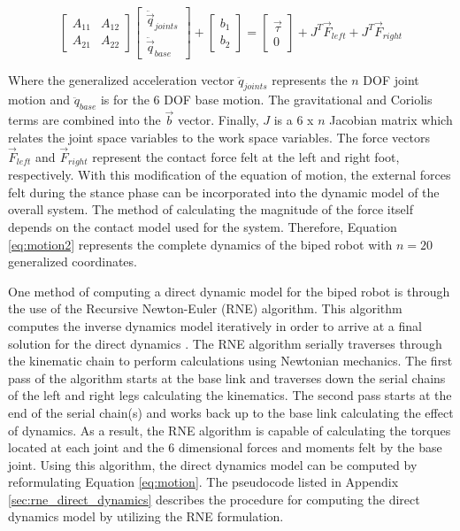 \begin{equation}
	\label{eq:motion2}
	\begin{bmatrix} A_{11} & A_{12} \\ A_{21} & A_{22} \end{bmatrix} 
	\begin{bmatrix} \ddot{\vec{q}}_{joints} \\ \ddot{\vec{q}}_{base} \end{bmatrix} + 
	\begin{bmatrix} b_{1} \\ b_{2} \end{bmatrix} = 
	\begin{bmatrix} \vec{\tau} \\ 0 \end{bmatrix} + 
    J^{T}\vec{F}_{left} + J^{T}\vec{F}_{right}
\end{equation}

Where the generalized acceleration vector $\ddot{q}_{joints}$ represents the $n$ DOF joint motion and $\ddot{q}_{base}$ is for the 6 DOF base motion. The gravitational and Coriolis terms are combined into the $\vec{b}$ vector. Finally, $J$ is a 6 x $n$ Jacobian matrix which relates the joint space variables to the work space variables. The force vectors $\vec{F}_{left}$ and $\vec{F}_{right}$ represent the contact force felt at the left and right foot, respectively. With this modification of the equation of motion, the external forces felt during the stance phase can be incorporated into the dynamic model of the overall system. The method of calculating the magnitude of the force itself depends on the contact model used for the system. Therefore, Equation \ref{eq:motion2} represents the complete dynamics of the biped robot with $n = 20$ generalized coordinates.

One method of computing a direct dynamic model for the biped robot is through the use of the Recursive Newton-Euler (RNE) algorithm. This algorithm computes the inverse dynamics model iteratively in order to arrive at a final solution for the direct dynamics \cite{Perrin:1997wn}. The RNE algorithm serially traverses through the kinematic chain to perform calculations using Newtonian mechanics. The first pass of the algorithm starts at the base link and traverses down the serial chains of the left and right legs calculating the kinematics. The second pass starts at the end of the serial chain(s) and works back up to the base link calculating the effect of dynamics. As a result, the RNE algorithm is capable of calculating the torques located at each joint and the 6 dimensional forces and moments felt by the base joint. Using this algorithm, the direct dynamics model can be computed by reformulating Equation \ref{eq:motion}. The pseudocode listed in Appendix \ref{sec:rne_direct_dynamics} describes the procedure for computing the direct dynamics model by utilizing the RNE formulation.

